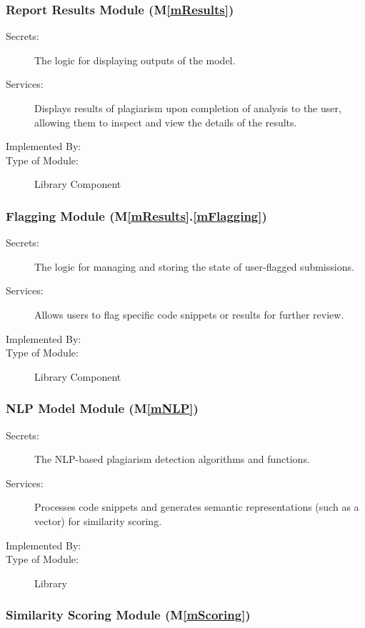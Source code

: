 \documentclass[12pt, titlepage]{article}
\newcommand{\mref}[1]{M\ref{#1}}
\newcommand{\smref}[2]{M\ref{#1}.\ref{#2}}
\begin{document}
\subsubsection{Report Results Module (\mref{mResults})}

\begin{description}
\item[Secrets:] The logic for displaying outputs of the model.
\item[Services:] Displays results of plagiarism upon completion of analysis to the user, allowing them to inspect and view the details of the results.
\item[Implemented By:] \progname{}
\item[Type of Module:] Library Component
\end{description}

\subsubsection{Flagging Module (\smref{mResults}{mFlagging})}

\begin{description}
\item[Secrets:] The logic for managing and storing the state of user-flagged submissions.
\item[Services:] Allows users to flag specific code snippets or results for further review.
\item[Implemented By:] \progname{}
\item[Type of Module:] Library Component
\end{description}

\subsubsection{NLP Model Module (\mref{mNLP})}

\begin{description}
\item[Secrets:] The NLP-based plagiarism detection algorithms and functions.
\item[Services:] Processes code snippets and generates semantic representations (such as a vector) 
for similarity scoring.
\item[Implemented By:] \progname{}
\item[Type of Module:] Library
\end{description}

\subsubsection{Similarity Scoring Module (\mref{mScoring})}
\end{document}
